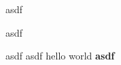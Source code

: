\documentclass{article}
\begin{document}
asdf

{asdf}

{asdf \enskip asdf hello world \textbf{asdf}}
\end{document}
